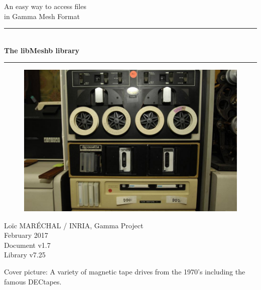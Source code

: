 \documentclass[a4paper,12pt]{article}
\newcommand{\HRule}{\rule{\linewidth}{1mm}}
\begin{document}
%
%

\begin{titlepage}

\begin{center}
\huge An easy way to access files\\ in Gamma Mesh Format
\HRule \\
\medskip
{\Huge \bfseries The libMeshb library} \\
\HRule
\end{center}

\vfill

\begin{figure}[htbp]
\begin{center}
\includegraphics[width=14cm]{tape.jpeg}
\end{center}
\end{figure}

\vfill

\begin{flushright}
\Large Lo\"ic MAR\'ECHAL / INRIA, Gamma Project\\
\Large February 2017 \\
\normalsize Document v1.7 \\
\normalsize Library v7.25
\end{flushright}

\end{titlepage}

\clearpage

\setcounter{tocdepth}{2}
\tableofcontents
\vfill

\footnotesize{Cover picture: A variety of magnetic tape drives from the 1970’s including the famous DECtapes.}
\normalsize

\clearpage
\end{document}
